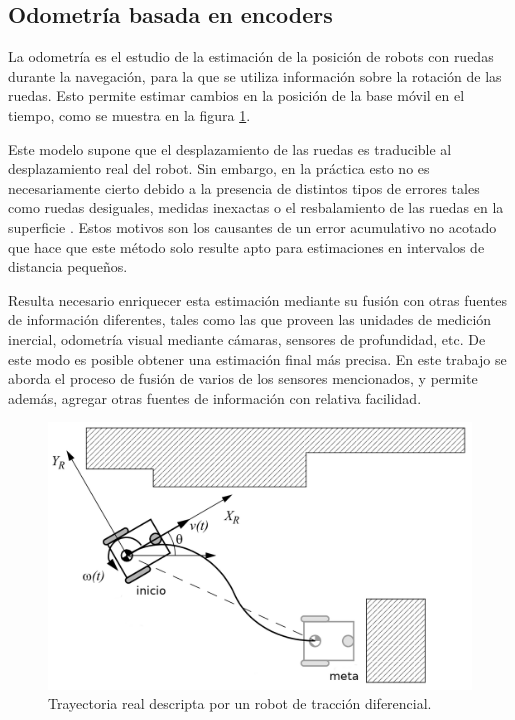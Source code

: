 \subsection{Odometría basada en encoders}

La odometría es el estudio de la estimación de la posición de robots con ruedas durante la navegación, para la que se utiliza información sobre la rotación de las ruedas. Esto permite estimar cambios en la posición de la base móvil en el tiempo, como se muestra en la figura \ref{fig:navigation}.

Este modelo supone que el desplazamiento de las ruedas es traducible al desplazamiento real del robot. Sin embargo, en la práctica esto no es necesariamente cierto debido a la presencia de distintos tipos de errores tales como ruedas desiguales, medidas inexactas o el resbalamiento de las ruedas en la superficie \citep{PAPER:2}. Estos motivos son los causantes de un error acumulativo no acotado que hace que este método solo resulte apto para estimaciones en intervalos de distancia pequeños.

Resulta necesario enriquecer esta estimación mediante su fusión con otras fuentes de información diferentes, tales como las que proveen las unidades de medición inercial, odometría visual mediante cámaras, sensores de profundidad, etc. De este modo es posible obtener una estimación final más precisa. En este trabajo se aborda el proceso de fusión de varios de los sensores mencionados, y permite además, agregar otras fuentes de información con relativa facilidad.

\begin{figure}[ht]
    \centering
    \includegraphics[scale=0.9]{./Figures/navigation.png}
    \caption{Trayectoria real descripta por un robot de tracción diferencial.}
    \label{fig:navigation}
\end{figure}

